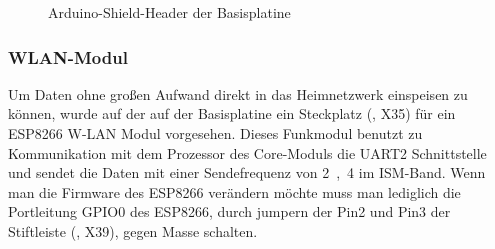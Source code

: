 \begin{figure}[htb]
    \centering
    \qquad
    \qquad
    \caption[Arduino-Shield-Header der Basisplatine]{Arduino-Shield-Header der \gls{Basisplatine}}
    \label{fig:basisplatine-arduino}
\end{figure}

\subsubsection{WLAN-Modul \cite{basis:wlan}}
Um Daten ohne großen Aufwand direkt in das Heimnetzwerk einspeisen zu können, wurde auf der auf der \gls{Basisplatine} ein Steckplatz (, X35) für ein ESP8266 W-LAN Modul vorgesehen. Dieses Funkmodul benutzt zu Kommunikation mit dem Prozessor des Core-Moduls die UART2 Schnittstelle und sendet die Daten mit einer Sendefrequenz von \unit{2,4}{\giga\hertz} im ISM-Band. Wenn man die Firmware des ESP8266 verändern möchte muss man lediglich die Portleitung GPIO0 des ESP8266, durch jumpern der Pin2 und Pin3 der Stiftleiste (, X39), gegen Masse schalten.

